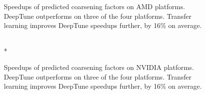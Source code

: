 \begin{figure}
{    \label{fig:pact-speedup-b}%
  }%
  \caption[Speedups of predicted thread coarsening factors on AMD]{%
    Speedups of predicted coarsening factors on AMD platforms. DeepTune outperforms \citeauthor{Magni2014} on three of the four platforms. Transfer learning improves DeepTune speedups further, by 16\% on average.%
  }%
  \label{fig:pact-speedup-left}
\end{figure}

\begin{figure}
  \centering %
  \\*
  \caption[Speedups of predicted thread coarsening factors on NVIDIA]{%
    Speedups of predicted coarsening factors on NVIDIA platforms. DeepTune outperforms \citeauthor{Magni2014} on three of the four platforms. Transfer learning improves DeepTune speedups further, by 16\% on average.%
  }%
  \label{fig:pact-speedup-right}
\end{figure}
